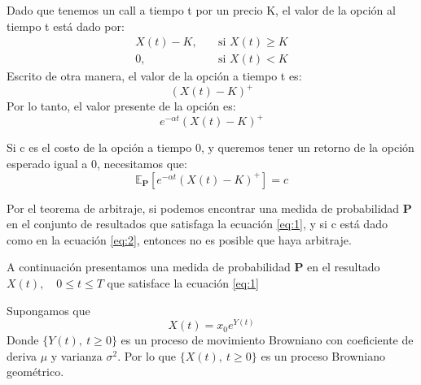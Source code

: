 \documentclass{beamer}
\begin{document}
\begin{frame}
Dado que tenemos un call a tiempo t por un precio K, el valor de la opción al tiempo t está dado por:
\begin{align*}
	X(t) - K, \quad &\text{si } X(t) \ge K\\
        0,  \quad &\text{si } X(t) < K
\end{align*}
Escrito de otra manera, el valor de la opción a tiempo t es:
\begin{equation*}
\left( X(t) - K \right)^{+}
\end{equation*}
Por lo tanto, el valor presente de la opción es:
\begin{equation*}
e^{-\alpha t}\left( X(t) - K \right)^{+}
\end{equation*}
\end{frame}
\begin{frame}
Si c es el costo de la opción a tiempo 0, y queremos tener un retorno de la opción esperado igual a 0, necesitamos que:
\begin{equation} \label{eq:2}
\mathbb{E}_{\textbf{P}}[e^{-\alpha t}\left( X(t) - K \right)^{+}] = c
\end{equation}
\end{frame}
\begin{frame}
	Por el teorema de arbitraje, si podemos encontrar una medida de probabilidad $\textbf{P}$ en el conjunto de resultados que satisfaga la ecuación \ref{eq:1}, y si c está dado como en la ecuación \ref{eq:2}, entonces no es posible que haya arbitraje.
\end{frame}
\begin{frame}
A continuación presentamos una medida de probabilidad $\textbf{P}$ en el resultado $X(t),\quad 0 \leq t \leq T$ que satisface la ecuación \ref{eq:1}\par
Supongamos que
\begin{equation*}
	X(t) = x_{0}e^{Y(t)}
\end{equation*}
Donde $\{Y(t),\ t\geq 0\}$ es un proceso de movimiento Browniano con coeficiente de deriva $\mu$ y varianza $\sigma^2$. Por lo que $\{X(t),\ t\geq 0\}$ es un proceso Browniano geométrico.
\end{frame}
\end{document}
